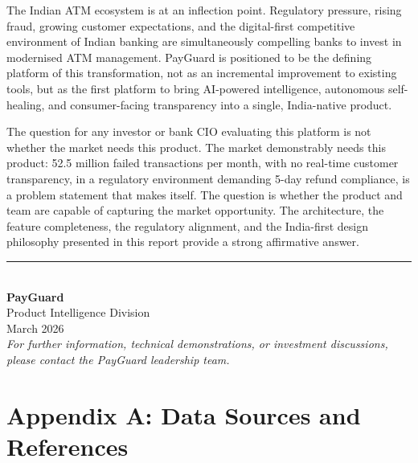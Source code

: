 \documentclass[12pt,a4paper]{article}
\begin{document}
The Indian ATM ecosystem is at an inflection point. Regulatory pressure, rising fraud, growing
customer expectations, and the digital-first competitive environment of Indian banking are
simultaneously compelling banks to invest in modernised ATM management. PayGuard is
positioned to be the defining platform of this transformation, not as an incremental
improvement to existing tools, but as the first platform to bring AI-powered intelligence,
autonomous self-healing, and consumer-facing transparency into a single, India-native product.

The question for any investor or bank CIO evaluating this platform is not whether the market
needs this product. The market demonstrably needs this product: 52.5 million failed
transactions per month, with no real-time customer transparency, in a regulatory environment
demanding 5-day refund compliance, is a problem statement that makes itself. The question is
whether the product and team are capable of capturing the market opportunity. The architecture,
the feature completeness, the regulatory alignment, and the India-first design philosophy
presented in this report provide a strong affirmative answer.

\vspace{1cm}

\begin{center}
  \rule{8cm}{0.4pt}\\[0.3cm]
  {\large\bfseries PayGuard}\\
  {\normalsize Product Intelligence Division}\\
  {\normalsize March 2026}\\[0.3cm]
  {\small\itshape For further information, technical demonstrations, or investment discussions,\\
  please contact the PayGuard leadership team.}
\end{center}

\newpage

\appendix
\section*{Appendix A: Data Sources and References}
\end{document}
